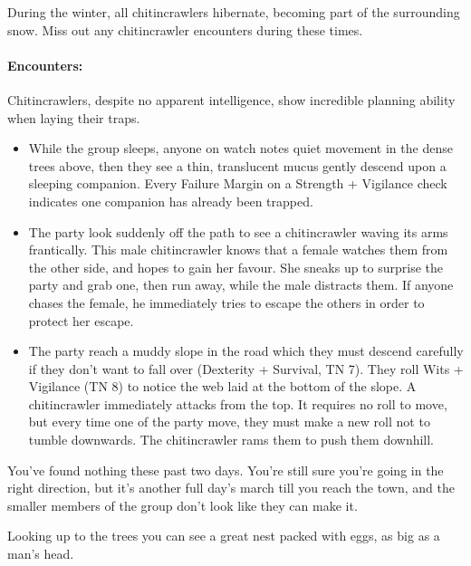 \begin{multicols}{2}
During the winter, all chitincrawlers hibernate, becoming part of the surrounding snow.  Miss out any chitincrawler encounters during these times.

\paragraph{Encounters:} Chitincrawlers, despite no apparent intelligence, show incredible planning ability when laying their traps.

\begin{itemize}

	\item{While the group sleeps, anyone on watch notes quiet movement in the dense trees above, then they see a thin, translucent mucus gently descend upon a sleeping companion.
	Every Failure Margin on a Strength + Vigilance check indicates one companion has already been trapped.}
	\item{The party look suddenly off the path to see a chitincrawler waving its arms frantically.
	This male chitincrawler knows that a female watches them from the other side, and hopes to gain her favour.
	She sneaks up to surprise the party and grab one, then run away, while the male distracts them.
	If anyone chases the female, he immediately tries to escape the others in order to protect her escape.}
	\item{The party reach a muddy slope in the road which they must descend carefully if they don't want to fall over (Dexterity + Survival, TN 7).
	They roll Wits + Vigilance (TN 8) to notice the web laid at the bottom of the slope.
	A chitincrawler immediately attacks from the top.
	It requires no roll to move, but every time one of the party move, they must make a new roll not to tumble downwards.
	The chitincrawler rams them to push them downhill.%
	\iftoggle{core}{%
	\footnote{See the core book, page \pageref{ram} for this manoeuvre.}
	}{}
	}

\end{itemize}

\label{griffin}

\begin{boxtext}

	You've found nothing these past two days.  You're still sure you're going in the right direction, but it's another full day's march till you reach the town, and the smaller members of the group don't look like they can make it.

	Looking up to the trees you can see a great nest packed with eggs, as big as a man's head.


\end{boxtext}
\end{multicols}
